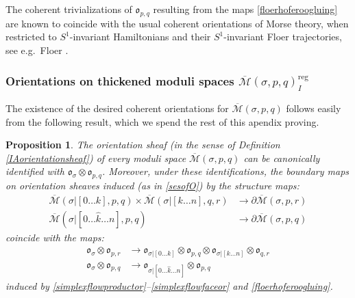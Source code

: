 \documentclass[12pt]{article}
\newtheorem{proposition}[theorem]{Proposition}
\theoremstyle{definition}
\theoremstyle{remark}
\numberwithin{equation}{subsection}
\newcommand{\oo}{\mathfrak o}
\newcommand{\Mbar}{\overline{\mathcal M}}
\newcommand{\reg}{\mathrm{reg}}
\begin{document}
The coherent trivializations of $\oo_{p,q}$ resulting from the maps \eqref{floerhoferoogluing} are known to coincide with the usual coherent orientations of Morse theory, when restricted to $S^1$-invariant Hamiltonians and their $S^1$-invariant Floer trajectories, see e.g.\ Floer \cite{floersfhs}.

\subsubsection{Orientations on thickened moduli spaces $\Mbar(\sigma,p,q)_I^\reg$}

The existence of the desired coherent orientations for $\Mbar(\sigma,p,q)$ follows easily from the following result, which we spend the rest of this apendix proving.

\begin{proposition}\label{gluingHForientations}
The orientation sheaf (in the sense of Definition \ref{IAorientationsheaf}) of every moduli space $\Mbar(\sigma,p,q)$ can be canonically identified with $\oo_\sigma\otimes\oo_{p,q}$.  Moreover, under these identifications, the boundary maps on orientation sheaves induced (as in \eqref{sesofO}) by the structure maps:
\begin{align}
\label{hforproduct}\Mbar(\sigma|[0\ldots k],p,q)\times\Mbar(\sigma|[k\ldots n],q,r)&\to\partial\Mbar(\sigma,p,r)\\
\label{hforface}\Mbar(\sigma|[0\ldots\hat k\ldots n],p,q)&\to\partial\Mbar(\sigma,p,q)
\end{align}
coincide with the maps:
\begin{align}
\label{hforproductor}\oo_\sigma\otimes\oo_{p,r}&\to\oo_{\sigma|[0\ldots k]}\otimes\oo_{p,q}\otimes\oo_{\sigma|[k\ldots n]}\otimes\oo_{q,r}\\
\label{hforfaceor}\oo_\sigma\otimes\oo_{p,q}&\to\oo_{\sigma|[0\ldots\hat k\ldots n]}\otimes\oo_{p,q}
\end{align}
induced by \eqref{simplexflowproductor}--\eqref{simplexflowfaceor} and \eqref{floerhoferoogluing}.
\end{proposition}
\end{document}
